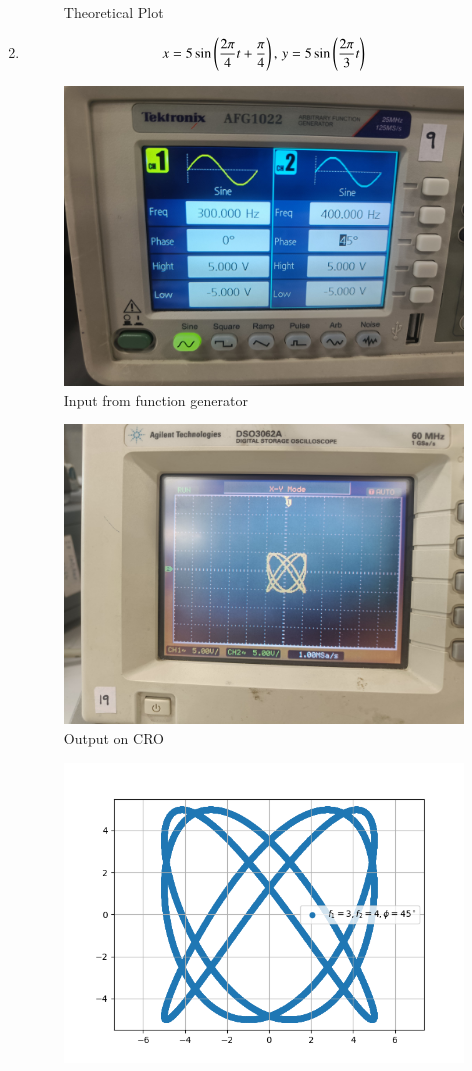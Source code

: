 \documentclass[journal]{IEEEtran}
\begin{document}
\begin{enumerate}
\begin{figure}[H]
        \caption{Theoretical Plot}
    \end{figure}
    \item \begin{align}
        x = 5\sin\left(\frac{2\pi}{4}t+\frac{\pi}{4}\right),\,y = 5\sin\left(\frac{2\pi}{3}t\right)
    \end{align}
    \begin{figure}[H]
        \centering
        \includegraphics[width=0.7\columnwidth]{pics/WhatsApp Image 2025-01-24 at 11.02.16(2).jpeg}
        \caption{Input from function generator}
    \end{figure}
    \begin{figure}[H]
        \centering
        \includegraphics[width=0.7\columnwidth]{pics/WhatsApp Image 2025-01-24 at 11.02.16(1).jpeg}
        \caption{Output on CRO}
    \end{figure}
    \begin{figure}[H]
        \centering
        \includegraphics[width=0.7\columnwidth]{figs/fig3.png}

\end{figure}
\end{enumerate}
\end{document}
